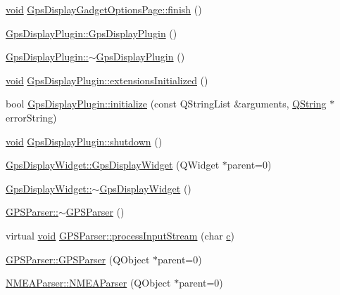 \begin{DoxyCompactItemize}
\item 
\hyperlink{group___u_a_v_objects_plugin_ga444cf2ff3f0ecbe028adce838d373f5c}{void} \hyperlink{group___g_p_s_gadget_plugin_gaa513cdfb1866a8dec9976710811b48cb}{Gps\-Display\-Gadget\-Options\-Page\-::finish} ()
\item 
\hyperlink{group___g_p_s_gadget_plugin_ga48d06ebeae3e8a6acb71c7a3c1e8c6c0}{Gps\-Display\-Plugin\-::\-Gps\-Display\-Plugin} ()
\item 
\hyperlink{group___g_p_s_gadget_plugin_gaa42f8ee4562f96fdd5e4c384bf7ca1d6}{Gps\-Display\-Plugin\-::$\sim$\-Gps\-Display\-Plugin} ()
\item 
\hyperlink{group___u_a_v_objects_plugin_ga444cf2ff3f0ecbe028adce838d373f5c}{void} \hyperlink{group___g_p_s_gadget_plugin_gad0d01fd7addd024c1a5fad7002a7c358}{Gps\-Display\-Plugin\-::extensions\-Initialized} ()
\item 
bool \hyperlink{group___g_p_s_gadget_plugin_ga481b9c74a2e46d2e461d472ac2e10c8f}{Gps\-Display\-Plugin\-::initialize} (const Q\-String\-List \&arguments, \hyperlink{group___u_a_v_objects_plugin_gab9d252f49c333c94a72f97ce3105a32d}{Q\-String} $\ast$error\-String)
\item 
\hyperlink{group___u_a_v_objects_plugin_ga444cf2ff3f0ecbe028adce838d373f5c}{void} \hyperlink{group___g_p_s_gadget_plugin_ga239f5aa443093c518b27a04e23d20b2e}{Gps\-Display\-Plugin\-::shutdown} ()
\item 
\hyperlink{group___g_p_s_gadget_plugin_gab1f79fecf5da3b9fde3b8c100406dfd8}{Gps\-Display\-Widget\-::\-Gps\-Display\-Widget} (Q\-Widget $\ast$parent=0)
\item 
\hyperlink{group___g_p_s_gadget_plugin_gaf71af26494c1e959b1b6b3eabd861e53}{Gps\-Display\-Widget\-::$\sim$\-Gps\-Display\-Widget} ()
\item 
\hyperlink{group___g_p_s_gadget_plugin_ga6773ae49e6fecc274191f0d0e29294d8}{G\-P\-S\-Parser\-::$\sim$\-G\-P\-S\-Parser} ()
\item 
virtual \hyperlink{group___u_a_v_objects_plugin_ga444cf2ff3f0ecbe028adce838d373f5c}{void} \hyperlink{group___g_p_s_gadget_plugin_gaeffbbe785fb02705aba8d3e2b0aee5e5}{G\-P\-S\-Parser\-::process\-Input\-Stream} (char \hyperlink{glext_8h_a1f2d7f8147412c43ba2303a56f97ee73}{c})
\item 
\hyperlink{group___g_p_s_gadget_plugin_ga15bb435154bfad7f732bc090c496915e}{G\-P\-S\-Parser\-::\-G\-P\-S\-Parser} (Q\-Object $\ast$parent=0)
\item 
\hyperlink{group___g_p_s_gadget_plugin_gababc72322cf2d939a88939cc9036d884}{N\-M\-E\-A\-Parser\-::\-N\-M\-E\-A\-Parser} (Q\-Object $\ast$parent=0)

\end{DoxyCompactItemize}
